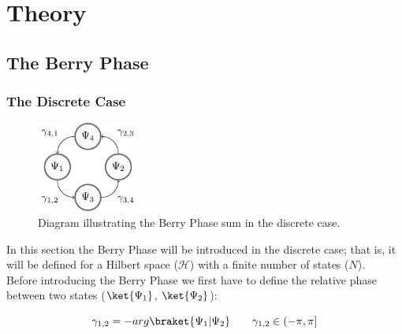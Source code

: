 \documentclass{article}
\begin{document}
\section{Theory\label{sec:the_berry_phase}}

\subsection{The Berry Phase}
\subsubsection{The Discrete Case \label{ssec:discrete_case}}

  \begin{figure}
    \includegraphics[width=0.3\textwidth]{berry_loop}
    \caption{Diagram illustrating the Berry Phase sum in the discrete case.}
    \label{fig:berry_loop}
  \end{figure}

In this section the Berry Phase will be introduced in the discrete case; that is, it will be defined for a Hilbert space ($\mathcal{H}$) with a finite number of states ($N$). \\ 

Before introducing the Berry Phase we first have to define the relative phase between two states ($\ket{\Psi_1}$, $\ket{\Psi_2}$):

  \begin{equation*} \label{eq:relative_phase}
    \gamma_{1,2} = -arg \braket{\Psi_{1}|\Psi_{2}} \qquad \gamma_{1, 2} \in (-\pi, \pi]
  \end{equation*}
\end{document}
